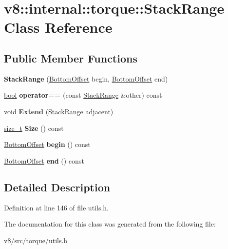 \hypertarget{classv8_1_1internal_1_1torque_1_1StackRange}{}\section{v8\+:\+:internal\+:\+:torque\+:\+:Stack\+Range Class Reference}
\label{classv8_1_1internal_1_1torque_1_1StackRange}
\subsection*{Public Member Functions}
\begin{DoxyCompactItemize}
\item 
\mbox{\label{classv8_1_1internal_1_1torque_1_1StackRange_a39276518f678c71fc8bea873c0f20021}} 
{\bfseries Stack\+Range} (\mbox{\hyperlink{structv8_1_1internal_1_1torque_1_1BottomOffset}{Bottom\+Offset}} begin, \mbox{\hyperlink{structv8_1_1internal_1_1torque_1_1BottomOffset}{Bottom\+Offset}} end)
\item 
\mbox{\label{classv8_1_1internal_1_1torque_1_1StackRange_a18fea1e3ab7bea4eb1bbea20355ac0cc}} 
\mbox{\hyperlink{classbool}{bool}} {\bfseries operator==} (const \mbox{\hyperlink{classv8_1_1internal_1_1torque_1_1StackRange}{Stack\+Range}} \&other) const
\item 
\mbox{\label{classv8_1_1internal_1_1torque_1_1StackRange_a0f4dcf13dfe295abbc500a5e5065a184}} 
void {\bfseries Extend} (\mbox{\hyperlink{classv8_1_1internal_1_1torque_1_1StackRange}{Stack\+Range}} adjacent)
\item 
\mbox{\label{classv8_1_1internal_1_1torque_1_1StackRange_ad23e1c54fe2afbc6a9d664b0b05c54a5}} 
\mbox{\hyperlink{classsize__t}{size\+\_\+t}} {\bfseries Size} () const
\item 
\mbox{\label{classv8_1_1internal_1_1torque_1_1StackRange_ad9751bb6363643d80134ba8747360887}} 
\mbox{\hyperlink{structv8_1_1internal_1_1torque_1_1BottomOffset}{Bottom\+Offset}} {\bfseries begin} () const
\item 
\mbox{\label{classv8_1_1internal_1_1torque_1_1StackRange_a9389be2872b41b3e20d5746fb64a1390}} 
\mbox{\hyperlink{structv8_1_1internal_1_1torque_1_1BottomOffset}{Bottom\+Offset}} {\bfseries end} () const
\end{DoxyCompactItemize}


\subsection{Detailed Description}


Definition at line 146 of file utils.\+h.



The documentation for this class was generated from the following file\+:\begin{DoxyCompactItemize}
\item 
v8/src/torque/utils.\+h\end{DoxyCompactItemize}
